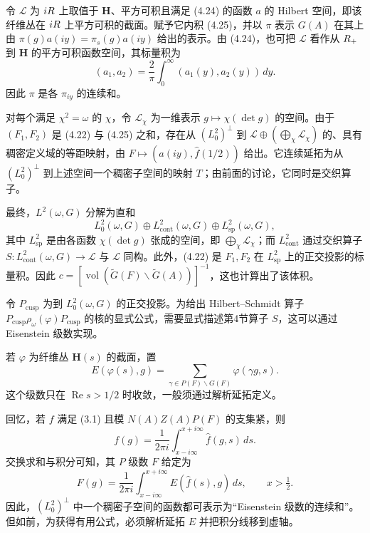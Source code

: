 令 $\mathcal L$ 为 $iR$ 上取值于 $\mathbf H$、平方可积且满足 (4.24) 的函数 $a$ 的 Hilbert 空间，即该纤维丛在 $iR$ 上平方可积的截面。赋予它内积 (4.25)，并以 $\pi$ 表示
$G(A)$ 在其上由 $\pi(g)a(iy)=\pi_s(g)a(iy)$ 给出的表示。由 (4.24)，也可把
$\mathcal L$ 看作从 $R_+$ 到 $\mathbf H$ 的平方可积函数空间，其标量积为
\[
 (a_1,a_2)=\frac2\pi\int_0^{\infty}(a_1(y),a_2(y))\,dy.
\]
因此 $\pi$ 是各 $\pi_{iy}$ 的连续和。

对每个满足 $\chi^2=\omega$ 的 $\chi$，令 $\mathcal L_\chi$ 为一维表示
$g\mapsto\chi(\det g)$ 的空间。由于 $(F_1,F_2)$ 是 (4.22) 与 (4.25) 之和，存在从
$(L_0^2)^\perp$ 到 $\mathcal L\oplus(\bigoplus_\chi\mathcal L_\chi)$ 的、具有稠密定义域的等距映射，由
$F\mapsto(a(iy),\widehat f(1/2))$ 给出。它连续延拓为从 $(L_0^2)^\perp$ 到上述空间一个稠密子空间的映射 $T$；由前面的讨论，它同时是交织算子。

最终，$L^2(\omega,G)$ 分解为直和
\[
 L_0^2(\omega,G)\oplus L_{\mathrm{cont}}^2(\omega,G)\oplus L_{\mathrm{sp}}^2(\omega,G),
\]
其中 $L_{\mathrm{sp}}^2$ 是由各函数 $\chi(\det g)$ 张成的空间，即
$\bigoplus_\chi\mathcal L_\chi$；而 $L_{\mathrm{cont}}^2$ 通过交织算子
$S:L_{\mathrm{cont}}^2(\omega,G)\to\mathcal L$ 与 $\mathcal L$ 同构。此外，(4.22) 是
$F_1,F_2$ 在 $L_{\mathrm{sp}}^2$ 上的正交投影的标量积。因此
$c=[\operatorname{vol}(\widetilde G(F)\backslash\widetilde G(A))]^{-1}$，这也计算出了该体积。

令 $P_{\mathrm{cusp}}$ 为到 $L_0^2(\omega,G)$ 的正交投影。为给出 Hilbert--Schmidt 算子
$P_{\mathrm{cusp}}\rho_\omega(\varphi)P_{\mathrm{cusp}}$ 的核的显式公式，需要显式描述第4节算子 $S$，这可以通过 Eisenstein 级数实现。

若 $\varphi$ 为纤维丛 $\mathbf H(s)$ 的截面，置
\begin{equation}
 E(\varphi(s),g)=\sum_{\gamma\in P(F)\backslash G(F)}\varphi(\gamma g,s).\tag{5.1}
\end{equation}
这个级数只在 $\operatorname{Re}s>1/2$ 时收敛，一般须通过解析延拓定义。

回忆，若 $f$ 满足 (3.1) 且模 $N(A)Z(A)P(F)$ 的支集紧，则
\[
f(g)=\frac1{2\pi i}\int_{x-i\infty}^{x+i\infty}\widehat f(g,s)\,ds.
\]交换求和与积分可知，其
$P$ 级数 $F$ 给定为
\begin{equation}
 F(g)=\frac1{2\pi i}\int_{x-i\infty}^{x+i\infty}E(\widehat f(s),g)\,ds,
 \qquad x>\tfrac12.\tag{5.2}
\end{equation}
因此，$(L_0^2)^\perp$ 中一个稠密子空间的函数都可表示为“Eisenstein 级数的连续和”。但如前，为获得有用公式，必须解析延拓 $E$ 并把积分线移到虚轴。

